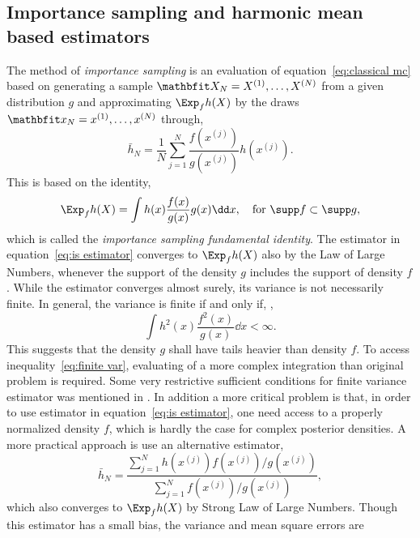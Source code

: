 \subsection{Importance sampling and harmonic mean based estimators}
\label{sub:Importance sampling and harmonic mean based estimators}

The method of \emph{importance sampling} is an evaluation of
equation~\eqref{eq:classical mc} based on generating a sample $\bfX_N =
\mcvec{X}{N}$ from a given distribution $g$ and approximating $\Exp_f h(X)$ by
the draws $\bfx_N = \mcvec{x}{N}$ through,
\begin{equation}
  \bar{h}_N = \frac{1}{N}\sum_{j=1}^N
  \frac{f(x^{(j)})}{g(x^{(j)})} h(x^{(j)}).
  \label{eq:is estimator}
\end{equation}
This is based on the identity,
\begin{equation}
  \Exp_f h(X) = \int h(x)\frac{f(x)}{g(x)}g(x)\dd x,
  \quad \text{for } \supp f \subset \supp g,
\end{equation}
which is called the \emph{importance sampling fundamental identity}. The
estimator in equation~\eqref{eq:is estimator} converges to $\Exp_f h(X)$ also
by the Law of Large Numbers, whenever the support of the density $g$ includes
the support of density $f$. While the estimator converges almost surely, its
variance is not necessarily finite. In general, the variance is finite if and
only if, \parencite[see][sec.~3.3]{Robert2004},
\begin{equation}
  \int h^2(x)\frac{f^2(x)}{g(x)}\dd x < \infty.
  \label{eq:finite var}
\end{equation}
This suggests that the density $g$ shall have tails heavier than density $f$.
To access inequality~\eqref{eq:finite var}, evaluating of a more complex
integration than original problem is required. Some very restrictive
sufficient conditions for finite variance estimator was mentioned in
\textcite{Geweke1989}. In addition a more critical problem is that, in order
to use estimator in equation~\eqref{eq:is estimator}, one need access to a
properly normalized density $f$, which is hardly the case for complex
posterior densities. A more practical approach is use an alternative
estimator,
\begin{equation}
  \bar{h}_N =
  \frac{\sum_{j = 1}^N h(x^{(j)}) f(x^{(j)}) / g(x^{(j)})}
  {\sum_{j=1}^N f(x^{(j)})/g(x^{(j)})},
  \label{eq:is est}
\end{equation}
which also converges to $\Exp_f h(X)$ by Strong Law of Large Numbers. Though
this estimator has a small bias, the variance and mean square errors are
